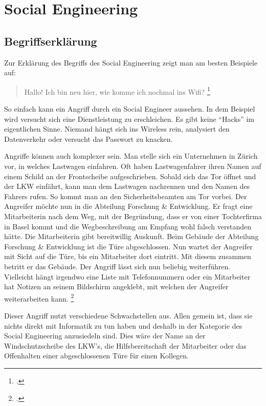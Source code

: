 \setcounter{secnumdepth}{3}
\chapter{Social Engineering}
\label{sec:socialengineering}

\section{Begriffserklärung}
\label{sec:socialengineering:begriffserklaerung}
Zur Erklärung des Begriffs des Social Engineering zeigt man am besten Beispiele auf:

\begin{quote}
	Hallo! Ich bin neu hier, wie komme ich nochmal ins Wifi? \footcite{Social_Engineering_Wenn_die_Gefahr_im_Anzug_kommt__t3n_2015-04-26}
\end{quote}

So einfach kann ein Angriff durch ein Social Engineer aussehen. In dem Beispiel wird versucht sich eine Dienstleistung zu erschleichen. Es gibt keine "`Hacks"' im eigentlichen Sinne. Niemand hängt sich ins Wireless rein, analysiert den Datenverkehr oder versucht das Passwort zu knacken.

Angriffe können auch komplexer sein. Man stelle sich ein Unternehmen in Zürich vor, in welches Lastwagen einfahren. Oft haben Lastwagenfahrer ihren Namen auf einem Schild an der Frontscheibe aufgeschrieben. Sobald sich das Tor öffnet und der LKW einfährt, kann man dem Lastwagen nachrennen und den Namen des Fahrers rufen. So kommt man an den Sicherheitsbeamten am Tor vorbei. 
Der Angreifer möchte nun in die Abteilung Forschung \& Entwicklung. Er fragt eine Mitarbeiterin nach dem Weg, mit der Begründung, dass er von einer Tochterfirma in Basel kommt und die Wegbeschreibung am Empfang wohl falsch verstanden hätte. Die Mitarbeiterin gibt bereitwillig Auskunft.
Beim Gebäude der Abteilung Forschung \& Entwicklung ist die Türe abgeschlossen. Nun wartet der Angreifer mit Sicht auf die Türe, bis ein Mitarbeiter dort eintritt. Mit diesem zusammen betritt er das Gebäude. 
Der Angriff lässt sich nun beliebig weiterführen. Vielleicht hängt irgendwo eine Liste mit Telefonnummern oder ein Mitarbeiter hat Notizen an seinem Bildschirm angeklebt, mit welchen der Angreifer weiterarbeiten kann. \footcite{Beispiel_fr_einen_Social_Engineering_Angriff_Social_Engineering_-_Manipulation_2015-04-26}

Dieser Angriff nutzt verschiedene Schwachstellen aus. Allen gemein ist, dass sie nichts direkt mit Informatik zu tun haben und deshalb in der Kategorie des Social Engineering anzusiedeln sind. Dies wäre der Name an der Windschutzscheibe des LKW's, die Hilfsbereitschaft der Mitarbeiter oder das Offenhalten einer abgeschlossenen Türe für einen Kollegen.

